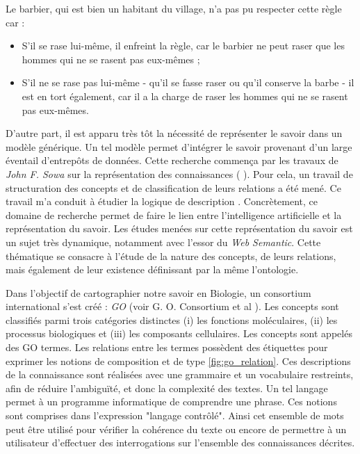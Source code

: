 \begin{refsegment}
{    Le barbier, qui est bien un habitant du village, n'a pas pu respecter cette règle car :
    \begin{itemize}
        \item S'il se rase lui-même, il enfreint la règle, car le barbier ne peut raser que les hommes qui ne se rasent pas eux-mêmes ;
        \item S'il ne se rase pas lui-même - qu'il se fasse raser ou qu'il conserve la barbe - il est en tort également, car il a la charge de raser les hommes qui ne se rasent pas eux-mêmes.
    \end{itemize}
}

D'autre part, il est apparu très tôt la nécessité de représenter le savoir dans un modèle générique. Un tel modèle permet d'intégrer le savoir provenant d'un large éventail d'entrepôts de données. Cette recherche commença par les travaux de \textit{John F. Sowa} sur la représentation des connaissances ( \citeyear{sowa92,sowa99}). Pour cela, un travail de structuration des concepts et de classification de leurs relations a été mené. Ce travail m'a conduit à étudier la logique de description \cite{baader2003description}. Concrètement, ce domaine de recherche permet de faire le lien entre l'intelligence artificielle et la représentation du savoir. Les études menées sur cette représentation du savoir est un sujet très dynamique, notamment avec l'essor du \textit{Web Semantic}. Cette thématique se consacre à l'étude de la nature des concepts, de leurs relations, mais également de leur existence définissant par la même l'ontologie.

Dans l'objectif de cartographier notre savoir en Biologie, un consortium international s'est créé : \textit{\gls{GO}} (voir G. O. Consortium
et al \citeyear{go2001,go2004}). Les concepts sont classifiés parmi trois catégories distinctes (i) les fonctions moléculaires, (ii) les processus biologiques et (iii) les composants cellulaires. Les concepts sont appelés des GO termes. Les relations entre les termes possèdent des étiquettes pour exprimer les notions de composition et de type \cref{fig:go_relation}. Ces descriptions de la connaissance sont réalisées avec une grammaire et un vocabulaire restreints, afin de réduire l'ambiguïté, et donc la complexité des textes. Un tel langage permet à un programme informatique de comprendre une phrase. Ces  notions sont comprises dans l'expression "langage contrôlé". Ainsi cet ensemble de mots peut être utilisé pour vérifier la cohérence du texte ou encore de permettre à un utilisateur d'effectuer des interrogations sur l'ensemble des connaissances décrites.


\end{refsegment}
